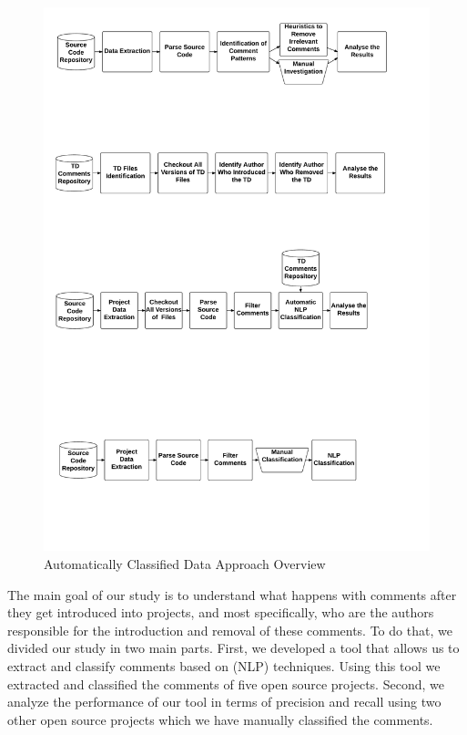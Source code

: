 
\begin{figure}[thb!]
  \centering
  \includegraphics[width=1\textwidth]{figures/automatically_classified_data_approach2.pdf}
  \caption{Automatically Classified Data Approach Overview}
  \label{fig:automatically_classified_data_approach_overview}
\end{figure}

The main goal of our study is to understand what happens with \SATD comments after they get introduced into projects, and most specifically, who are the authors responsible for the introduction and removal of these comments. To do that, we divided our study in two main parts. First, we developed a tool that allows us to extract and classify \SATD comments based on  (NLP) techniques. Using this tool we extracted and classified the comments of five open source projects. Second, we analyze the performance of our tool in terms of precision and recall using two other open source projects which we have manually classified the \SATD comments. 

